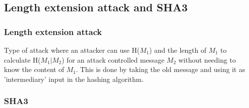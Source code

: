 \documentclass[12pt]{article}
\begin{document}
 \subsection{Length extension attack and SHA3}
 \subsubsection{Length extension attack}
 Type of attack where an attacker can use H($M_1$) and the length of $M_1$ to calculate H($M_1|M_2$) for an attack controlled message $M_2$ without needing to know the content of $M_1$. This is done by taking the old message and using it as 'intermediary' input in the hashing algorithm.
 \subsubsection{SHA3}
 
\end{document}
